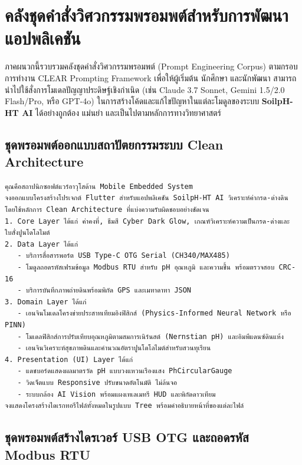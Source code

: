 \chapter{คลังชุดคำสั่งวิศวกรรมพรอมพต์สำหรับการพัฒนาแอปพลิเคชัน}
\label{app:prompts}

ภาคผนวกนี้รวบรวมคลังชุดคำสั่งวิศวกรรมพรอมพต์ (Prompt Engineering Corpus) ตามกรอบการทำงาน CLEAR Prompting Framework เพื่อให้ผู้เริ่มต้น นักศึกษา และนักพัฒนา สามารถนำไปใช้สั่งการโมเดลปัญญาประดิษฐ์เชิงกำเนิด (เช่น Claude 3.7 Sonnet, Gemini 1.5/2.0 Flash/Pro, หรือ GPT-4o) ในการสร้างโค้ดและแก้ไขปัญหาในแต่ละโมดูลของระบบ \textbf{SoilpH-HT AI} ได้อย่างถูกต้อง แม่นยำ และเป็นไปตามหลักการทางวิทยาศาสตร์

\section{ชุดพรอมพต์ออกแบบสถาปัตยกรรมระบบ Clean Architecture}

\begin{promptbox}[title={พรอมพต์ ก.1 การวางโครงสร้างโปรเจกต์ Flutter Clean Architecture}]
\begin{lstlisting}
คุณคือสถาปนิกซอฟต์แวร์อาวุโสด้าน Mobile Embedded System
จงออกแบบโครงสร้างโปรเจกต์ Flutter สำหรับแอปพลิเคชัน SoilpH-HT AI วิเคราะห์ค่ากรด-ด่างดิน
โดยใช้หลักการ Clean Architecture ที่แบ่งความรับผิดชอบอย่างชัดเจน
1. Core Layer ได้แก่ ค่าคงที่, ธีมสี Cyber Dark Glow, เกณฑ์วิเคราะห์ความเป็นกรด-ด่างและใบสั่งปูนโดโลไมต์
2. Data Layer ได้แก่
   - บริการสื่อสารพอร์ต USB Type-C OTG Serial (CH340/MAX485)
   - โมดูลถอดรหัสเฟรมข้อมูล Modbus RTU สำหรับ pH อุณหภูมิ และความชื้น พร้อมตรวจสอบ CRC-16
   - บริการบันทึกภาพถ่ายดินพร้อมพิกัด GPS และเมทาดาทา JSON
3. Domain Layer ได้แก่
   - เอนจินโมเดลโครงข่ายประสาทเทียมอิงฟิสิกส์ (Physics-Informed Neural Network หรือ PINN)
   - โมเดลฟิสิกส์การปรับเทียบอุณหภูมิตามสมการเนิร์นสต์ (Nernstian pH) และอิมพีแดนซ์ดินแห้ง
   - เอนจินวิเคราะห์สุขภาพดินและคำนวณอัตราปูนโดโลไมต์สำหรับสวนทุเรียน
4. Presentation (UI) Layer ได้แก่
   - แดชบอร์ดแสดงผลมาตรวัด pH แบบวงแหวนเรืองแสง PhCircularGauge
   - วิดเจ็ตแบบ Responsive ปรับขนาดอัตโนมัติ ไม่ล้นจอ
   - ระบบกล้อง AI Vision พร้อมแผงเทเลเมทรี HUD และพิกัดดาวเทียม
จงแสดงโครงสร้างไดเรกทอรีไฟล์ทั้งหมดในรูปแบบ Tree พร้อมคำอธิบายหน้าที่ของแต่ละไฟล์
\end{lstlisting}
\end{promptbox}

\section{ชุดพรอมพต์สร้างไดรเวอร์ USB OTG และถอดรหัส Modbus RTU}

